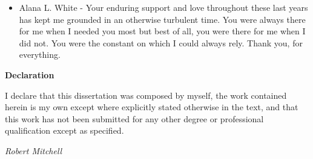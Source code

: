 \documentclass[a4paper,11pt,twoside,openright]{article}
\begin{document}
\begin{flushleft}
{\begin{itemize}
    \item{Alana L. White - Your enduring support and love throughout
      these last years has kept me grounded in an otherwise turbulent
      time. You were always there for me when I needed you most but
      best of all, you were there for me when I did not. You were the
      constant on which I could always rely. Thank you, for everything.}
    \end{itemize}
  }
\end{flushleft}

\newpage
\thispagestyle{empty}
\mbox{}
\newpage

\centering
{\LARGE\textbf{Declaration}}
\begin{flushleft}
  {\small
    I declare that this dissertation was composed by myself, the work
    contained herein is my own except where explicitly stated otherwise
    in the text, and that this work has not been submitted for any other
    degree or professional qualification except as specified.
    \newline\par

    \textit{Robert Mitchell}}

\end{flushleft}

\newpage
\thispagestyle{empty}
\mbox{}
\newpage
\end{document}

